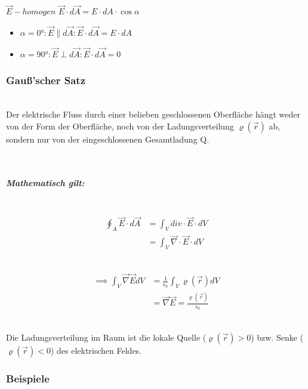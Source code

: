 \documentclass[11pt]{article}
\begin{document}
$\vec{E}-homogen$
$\vec{E}\cdot d\vec{A}= E\cdot dA\cdot \cos\alpha$

\begin{itemize}
	\item $\alpha=0°: \vec{E}\parallel d\vec{A}: \vec{E}\cdot d\vec{A}=E\cdot dA$\\
	\item $\alpha=90°: \vec{E}\perp d\vec{A}: \vec{E}\cdot d\vec{A}=0$
\end{itemize}

\subsubsection{Gauß'scher Satz}


\hfill\\

Der elektrische Fluss durch einer belieben geschlossenen Oberfläche hängt weder von der Form der Oberfläche, noch von der Ladungsverteilung $\varrho(\vec{r})$ ab, sondern nur von der eingeschlossenen Gesamtladung Q.

\hfill\\

\subparagraph{Mathematisch gilt:}

\hfill\\

\begin{align*}
	\oint_{A}\vec{E}\cdot d\vec{A}&=\int_{V} div\cdot \vec{E}\cdot dV\\
	&=\int_{V}\vec{\nabla}\cdot\vec{E}\cdot dV
\end{align*}

\hfill\\

\begin{align*}
	\implies \int_{V}\vec{\nabla}\vec{E}dV & =\frac{1}{\epsilon_0}\int_{V}\varrho(\vec{r})dV\\
	&=\vec{\nabla}\vec{E}=\frac{\varrho(\vec{r})}{\epsilon_0}
\end{align*}


\hfill\\

Die Ladungsverteilung im Raum ist die lokale Quelle ($\varrho(\vec{r})>0$) bzw. Senke ($\varrho(\vec{r})<0$) des elektrischen Feldes.

\subsubsection{Beispiele}\\
\end{document}
